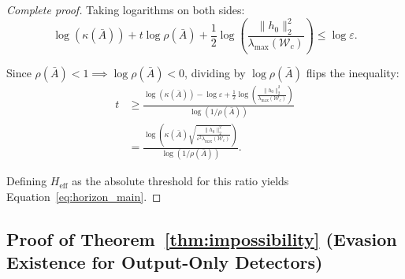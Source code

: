 \documentclass[10pt,twocolumn]{article}
\begin{document}
\begin{proof}[Complete proof]
Taking logarithms on both sides:
\begin{equation}
\log(\kappa(\bar{A})) + t \log \rho(\bar{A}) + \frac{1}{2} \log\left( \frac{\|h_0\|_2^2}{\lambda_{\max}(\mathcal{W}_c)} \right) \le \log \varepsilon.
\end{equation}

Since $\rho(\bar{A}) < 1 \implies \log \rho(\bar{A}) < 0$, dividing by $\log \rho(\bar{A})$ flips the inequality:
\begin{equation}
\begin{aligned}
t &\ge \frac{\log(\kappa(\bar{A})) - \log \varepsilon + \frac{1}{2} \log\left( \frac{\|h_0\|_2^2}{\lambda_{\max}(\mathcal{W}_c)} \right)}{\log(1/\rho(\bar{A}))} \\
&= \frac{\log\left( \kappa(\bar{A}) \sqrt{\frac{\|h_0\|_2^2}{\varepsilon^2 \lambda_{\max}(\mathcal{W}_c)}} \right)}{\log(1/\rho(\bar{A}))}.
\end{aligned}
\end{equation}

Defining $H_{\text{eff}}$ as the absolute threshold for this ratio yields Equation~\ref{eq:horizon_main}.
\end{proof}

\subsection{Proof of Theorem~\ref{thm:impossibility} (Evasion Existence for Output-Only Detectors)}
\label{proof:impossibility}
\end{document}
